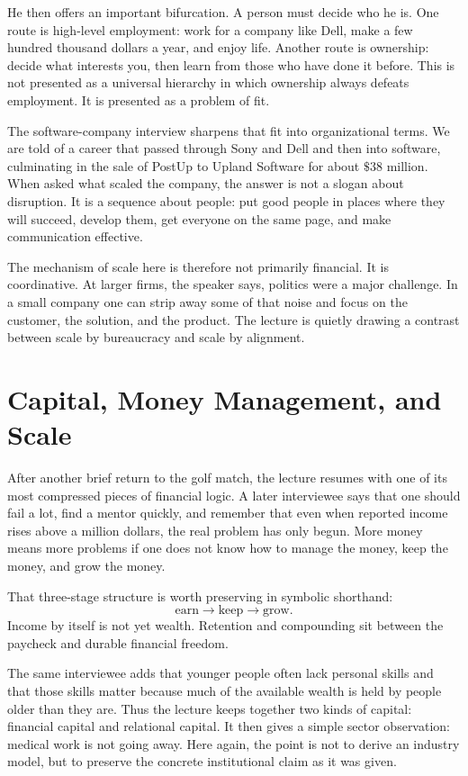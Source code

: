 He then offers an important bifurcation. A person must decide who he is. One route is high-level employment: work for a company like Dell, make a few hundred thousand dollars a year, and enjoy life. Another route is ownership: decide what interests you, then learn from those who have done it before. This is not presented as a universal hierarchy in which ownership always defeats employment. It is presented as a problem of fit.

The software-company interview sharpens that fit into organizational terms. We are told of a career that passed through Sony and Dell and then into software, culminating in the sale of PostUp to Upland Software for about \( \$38 \) million. When asked what scaled the company, the answer is not a slogan about disruption. It is a sequence about people: put good people in places where they will succeed, develop them, get everyone on the same page, and make communication effective.

The mechanism of scale here is therefore not primarily financial. It is coordinative. At larger firms, the speaker says, politics were a major challenge. In a small company one can strip away some of that noise and focus on the customer, the solution, and the product. The lecture is quietly drawing a contrast between scale by bureaucracy and scale by alignment.

\section{Capital, Money Management, and Scale}

After another brief return to the golf match, the lecture resumes with one of its most compressed pieces of financial logic. A later interviewee says that one should fail a lot, find a mentor quickly, and remember that even when reported income rises above a million dollars, the real problem has only begun. More money means more problems if one does not know how to manage the money, keep the money, and grow the money.

That three-stage structure is worth preserving in symbolic shorthand:
\begin{equation}
\text{earn} \longrightarrow \text{keep} \longrightarrow \text{grow}.
\end{equation}
Income by itself is not yet wealth. Retention and compounding sit between the paycheck and durable financial freedom.

The same interviewee adds that younger people often lack personal skills and that those skills matter because much of the available wealth is held by people older than they are. Thus the lecture keeps together two kinds of capital: financial capital and relational capital. It then gives a simple sector observation: medical work is not going away. Here again, the point is not to derive an industry model, but to preserve the concrete institutional claim as it was given.

